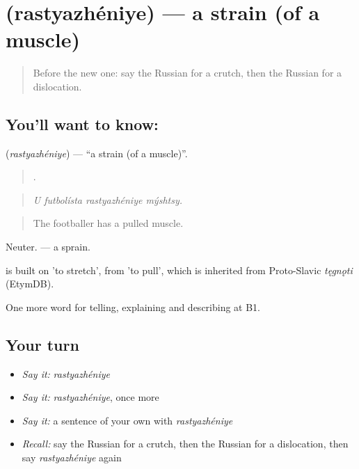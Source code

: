 \section[\texorpdfstring{\ru{растяжение} (rastyazhéniye)}{растяжение (rastyazhéniye)}]{ (rastyazhéniye) — a strain (of a muscle)}

\label{lesson:RU-C484-rastyazheniye}



\begin{quote}
Before the new one: say the Russian for a crutch, then the Russian for a dislocation.
\end{quote}

\subsection*{You'll want to know: }
\textbf{} (\emph{rastyazhéniye}) — \textquotedblleft{}a strain (of a muscle)\textquotedblright{}.

\begin{quote}
   .
\end{quote}

\begin{quote}
\emph{U futbolísta rastyazhéniye mýshtsy.}
\end{quote}

\begin{quote}
The footballer has a pulled muscle.
\end{quote}

Neuter. \emph{ } — a sprain.

\begin{cousinweb}
\emph{} is built on \emph{} 'to stretch', from \emph{} 'to pull', which is inherited from Proto-Slavic \emph{tęgnǫti} (EtymDB).
\end{cousinweb}

\begin{grammarlens}[title={What you've built}]
One more word for telling, explaining and describing at B1.
\end{grammarlens}

\subsection*{Your turn}
\begin{itemize}
\raggedright
  \item \emph{Say it:} \emph{rastyazhéniye}
  \item \emph{Say it:} \emph{rastyazhéniye}, once more
  \item \emph{Say it:} a sentence of your own with \emph{rastyazhéniye}
  \item \emph{Recall:} say the Russian for a crutch, then the Russian for a dislocation, then say \emph{rastyazhéniye} again
\end{itemize}

